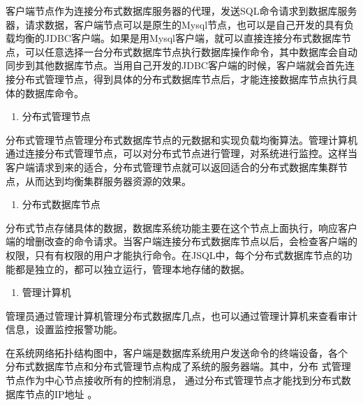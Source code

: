 	客户端节点作为连接分布式数据库服务器的代理，发送SQL命令请求到数据库服务器，请求数据，客户端节点可以是原生的Mysql节点，也可以是自己开发的具有负载均衡的JDBC客户端。如果是用Mysql客户端，就可以直接连接分布式数据库节点，可以任意选择一台分布式数据库节点执行数据库操作命令，其中数据库会自动同步到其他数据库节点。当用自己开发的JDBC客户端的时候，客户端就会首先连接分布式管理节点，得到具体的分布式数据库节点后，才能连接数据库节点执行具体的数据库命令。

	\begin{enumerate}[resume]
		\item 分布式管理节点
	\end{enumerate}

	分布式管理节点管理分布式数据库节点的元数据和实现负载均衡算法。管理计算机通过连接分布式管理节点，可以对分布式节点进行管理，对系统进行监控。这样当客户端请求到来的适合，分布式管理节点就可以返回适合的分布式数据库集群节点，从而达到均衡集群服务器资源的效果。

	\begin{enumerate}[resume]
		\item 分布式数据库节点
	\end{enumerate}

	分布式节点存储具体的数据，数据库系统功能主要在这个节点上面执行，响应客户端的增删改查的命令请求。当客户端连接分布式数据库节点以后，会检查客户端的权限，只有有权限的用户才能执行命令。在JSQL中，每个分布式数据库节点的功能都是独立的，都可以独立运行，管理本地存储的数据。

	\begin{enumerate}[resume]
		\item 管理计算机
	\end{enumerate}

	管理员通过管理计算机管理分布式数据库几点，也可以通过管理计算机来查看审计信息，设置监控报警功能。


在系统网络拓扑结构图中，客户端是数据库系统用户发送命令的终端设备，各个
分布式数据库节点和分布式管理节点构成了系统的服务器端。其中，分布
式管理节点作为中心节点接收所有的控制消息，
通过分布式管理节点才能找到分布式数据库节点的IP地址
。

